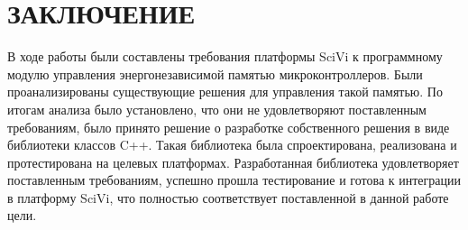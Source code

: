 \chapter*{ЗАКЛЮЧЕНИЕ}

В ходе работы были составлены требования платформы SciVi к программному модулю управления энергонезависимой памятью микроконтроллеров.
Были проанализированы существующие решения для управления такой памятью.
По итогам анализа было установлено, что они не удовлетворяют поставленным требованиям, было принято решение о разработке собственного решения в виде библиотеки классов C++.
Такая библиотека была спроектирована, реализована и протестирована на целевых платформах.
Разработанная библиотека удовлетворяет поставленным требованиям, успешно прошла тестирование и готова к интеграции в платформу SciVi, что полностью соответствует поставленной в данной работе цели.